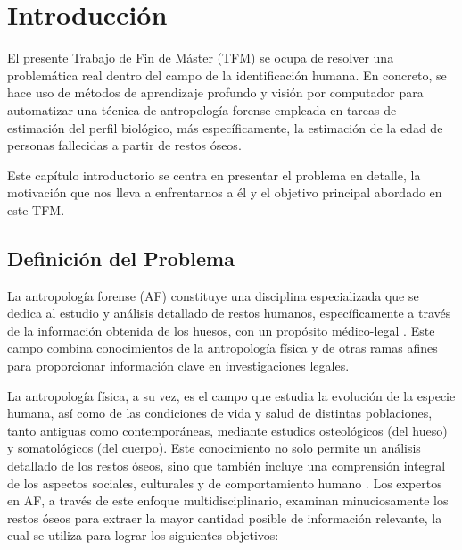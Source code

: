 \chapter{Introducción}
El presente Trabajo de Fin de Máster (TFM) se ocupa de resolver una problemática real dentro del campo de la identificación humana. En concreto, se hace uso de métodos de aprendizaje profundo y visión por computador para automatizar una técnica de antropología forense empleada en tareas de estimación del perfil biológico, más específicamente, la estimación de la edad de personas fallecidas a partir de restos óseos. 

Este capítulo introductorio se centra en presentar el problema en detalle, la motivación que nos lleva a enfrentarnos a él y el objetivo principal abordado en este TFM. 


\section{Definición del Problema}
\label{daIntro_ProblemDef}
La antropología forense (AF) constituye una disciplina especializada que se dedica al estudio y análisis detallado de restos humanos, específicamente a través de la información obtenida de los huesos, con un propósito médico-legal \cite{byers_introduction_2016,RefWorks:RefID:17-christensen2019forensic}. Este campo combina conocimientos de la antropología física y de otras ramas afines para proporcionar información clave en investigaciones legales.

La antropología física, a su vez, es el campo que estudia la evolución de la especie humana, así como de las condiciones de vida y salud de distintas poblaciones, tanto antiguas como contemporáneas, mediante estudios osteológicos (del hueso) y somatológicos (del cuerpo). Este conocimiento no solo permite un análisis detallado de los restos óseos, sino que también incluye una comprensión integral de los aspectos sociales, culturales y de comportamiento humano \cite{antrofisica}. Los expertos en AF, a través de este enfoque multidisciplinario, examinan minuciosamente los restos óseos para extraer la mayor cantidad posible de información relevante, la cual se utiliza para lograr los siguientes objetivos:


